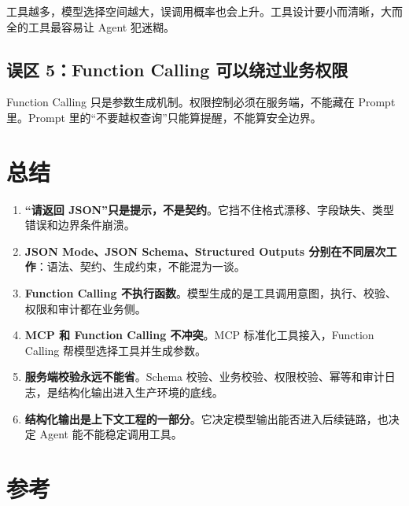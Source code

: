 \documentclass[9pt,a4paper,twocolumn]{ctexart}
\begin{document}
工具越多，模型选择空间越大，误调用概率也会上升。工具设计要小而清晰，大而全的工具最容易让 Agent 犯迷糊。



\subsection*{误区 5：Function Calling 可以绕过业务权限}


Function Calling 只是参数生成机制。权限控制必须在服务端，不能藏在 Prompt 里。Prompt 里的“不要越权查询”只能算提醒，不能算安全边界。



\section*{总结}

\begin{enumerate}[itemsep=1pt, topsep=2pt]
  \item \textbf{“请返回 JSON”只是提示，不是契约}。它挡不住格式漂移、字段缺失、类型错误和边界条件崩溃。
  \item \textbf{JSON Mode、JSON Schema、Structured Outputs 分别在不同层次工作}：语法、契约、生成约束，不能混为一谈。
  \item \textbf{Function Calling 不执行函数}。模型生成的是工具调用意图，执行、校验、权限和审计都在业务侧。
  \item \textbf{MCP 和 Function Calling 不冲突}。MCP 标准化工具接入，Function Calling 帮模型选择工具并生成参数。
  \item \textbf{服务端校验永远不能省}。Schema 校验、业务校验、权限校验、幂等和审计日志，是结构化输出进入生产环境的底线。
  \item \textbf{结构化输出是上下文工程的一部分}。它决定模型输出能否进入后续链路，也决定 Agent 能不能稳定调用工具。
\end{enumerate}


\section*{参考}
\end{document}
